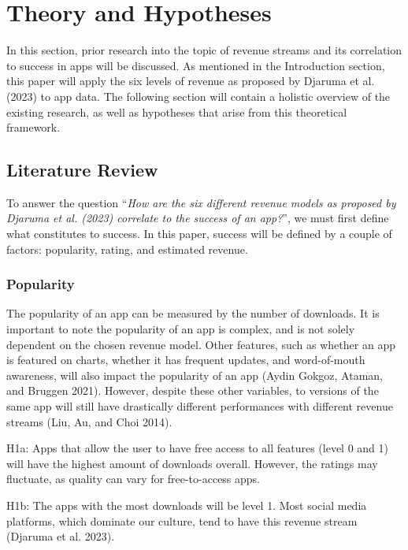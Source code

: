 \documentclass[
  12pt,
  a4paper,
]{article}
\begin{document}
\section{\texorpdfstring{Theory and Hypotheses
}{Theory and Hypotheses }}\label{theory-and-hypotheses}

In this section, prior research into the topic of revenue streams and
its correlation to success in apps will be discussed. As mentioned in
the Introduction section, this paper will apply the six levels of
revenue as proposed by Djaruma et al. (2023) to app data. The following
section will contain a holistic overview of the existing research, as
well as hypotheses that arise from this theoretical framework.

\subsection{Literature Review}\label{literature-review}

To answer the question ``\emph{How are the six different revenue models
as proposed by Djaruma et al. (2023) correlate to the success of an
app?}'', we must first define what constitutes to success. In this
paper, success will be defined by a couple of factors: popularity,
rating, and estimated revenue.

\subsubsection{Popularity}\label{popularity}

The popularity of an app can be measured by the number of downloads. It
is important to note the popularity of an app is complex, and is not
solely dependent on the chosen revenue model. Other features, such as
whether an app is featured on charts, whether it has frequent updates,
and word-of-mouth awareness, will also impact the popularity of an app
(Aydin Gokgoz, Ataman, and Bruggen 2021). However, despite these other
variables, to versions of the same app will still have drastically
different performances with different revenue streams (Liu, Au, and Choi
2014).

H1a: Apps that allow the user to have free access to all features (level
0 and 1) will have the highest amount of downloads overall. However, the
ratings may fluctuate, as quality can vary for free-to-access apps.

H1b: The apps with the most downloads will be level 1. Most social media
platforms, which dominate our culture, tend to have this revenue stream
(Djaruma et al. 2023).
\end{document}

